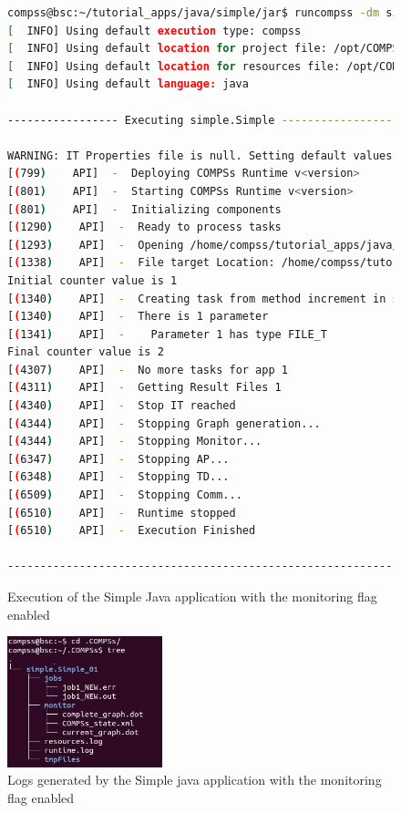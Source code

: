 \begin{figure}[ht!]
  \centering
  \begin{lstlisting}[language=bash]
compss@bsc:~/tutorial_apps/java/simple/jar$ runcompss -dm simple.Simple 1
[  INFO] Using default execution type: compss
[  INFO] Using default location for project file: /opt/COMPSs/Runtime/configuration/xml/projects/default_project.xml
[  INFO] Using default location for resources file: /opt/COMPSs/Runtime/configuration/xml/resources/default_resources.xml
[  INFO] Using default language: java

----------------- Executing simple.Simple --------------------------

WARNING: IT Properties file is null. Setting default values
[(799)    API]  -  Deploying COMPSs Runtime v<version>
[(801)    API]  -  Starting COMPSs Runtime v<version>
[(801)    API]  -  Initializing components
[(1290)    API]  -  Ready to process tasks
[(1293)    API]  -  Opening /home/compss/tutorial_apps/java/simple/jar/counter in mode OUT
[(1338)    API]  -  File target Location: /home/compss/tutorial_apps/java/simple/jar/counter
Initial counter value is 1
[(1340)    API]  -  Creating task from method increment in simple.SimpleImpl
[(1340)    API]  -  There is 1 parameter
[(1341)    API]  -    Parameter 1 has type FILE_T
Final counter value is 2
[(4307)    API]  -  No more tasks for app 1
[(4311)    API]  -  Getting Result Files 1
[(4340)    API]  -  Stop IT reached
[(4344)    API]  -  Stopping Graph generation...
[(4344)    API]  -  Stopping Monitor...
[(6347)    API]  -  Stopping AP...
[(6348)    API]  -  Stopping TD...
[(6509)    API]  -  Stopping Comm...
[(6510)    API]  -  Runtime stopped
[(6510)    API]  -  Execution Finished

------------------------------------------------------------
  \end{lstlisting}
  \caption{Execution of the Simple Java application with the monitoring flag enabled}
  \label{fig:simple_exec_monitor}
\end{figure}


\begin{figure}[ht!]
  \centering
    \includegraphics[width=0.4\textwidth]{./Sections/4_Tools/Figures/logs_with_monitor.jpeg}
    \caption{Logs generated by the Simple java application with the monitoring flag enabled}
    \label{fig:simple_logs_monitor}
\end{figure}

